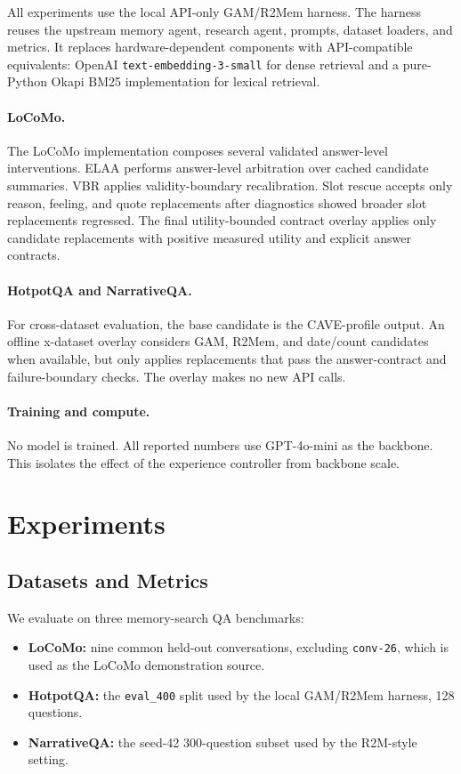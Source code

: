\documentclass[11pt]{article}
\begin{document}
All experiments use the local API-only GAM/R2Mem harness. The harness reuses
the upstream memory agent, research agent, prompts, dataset loaders, and
metrics. It replaces hardware-dependent components with API-compatible
equivalents: OpenAI \texttt{text-embedding-3-small} for dense retrieval and a
pure-Python Okapi BM25 implementation for lexical retrieval.

\paragraph{LoCoMo.}
The LoCoMo implementation composes several validated answer-level
interventions. ELAA performs answer-level arbitration over cached candidate
summaries. VBR applies validity-boundary recalibration. Slot rescue accepts
only reason, feeling, and quote replacements after diagnostics showed broader
slot replacements regressed. The final utility-bounded contract overlay applies
only candidate replacements with positive measured utility and explicit answer
contracts.

\paragraph{HotpotQA and NarrativeQA.}
For cross-dataset evaluation, the base candidate is the CAVE-profile output.
An offline x-dataset overlay considers GAM, R2Mem, and date/count candidates
when available, but only applies replacements that pass the answer-contract and
failure-boundary checks. The overlay makes no new API calls.

\paragraph{Training and compute.}
No model is trained. All reported numbers use GPT-4o-mini as the backbone.
This isolates the effect of the experience controller from backbone scale.

\section{Experiments}

\subsection{Datasets and Metrics}

We evaluate on three memory-search QA benchmarks:

\begin{itemize}[leftmargin=*]
  \item \textbf{LoCoMo:} nine common held-out conversations, excluding
  \texttt{conv-26}, which is used as the LoCoMo demonstration source.
  \item \textbf{HotpotQA:} the \texttt{eval\_400} split used by the local
  GAM/R2Mem harness, 128 questions.
  \item \textbf{NarrativeQA:} the seed-42 300-question subset used by the
  R2M-style setting.
\end{itemize}
\end{document}

